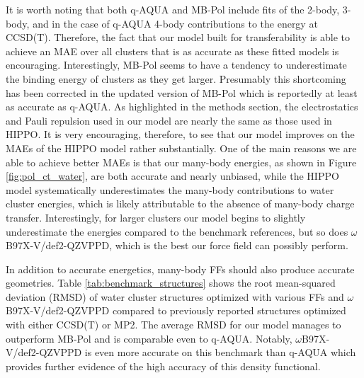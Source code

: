 \documentclass[journal=jctcce,manuscript=article]{achemso}
\begin{document}
It is worth noting that both q-AQUA and MB-Pol include fits of the 2-body, 3-body, and in the case of q-AQUA 4-body contributions to the energy at CCSD(T). Therefore, the fact that our model built for transferability is able to achieve an MAE over all clusters that is as accurate as these fitted models is encouraging. Interestingly, MB-Pol seems to have a tendency to underestimate the binding energy of clusters as they get larger. Presumably this shortcoming has been corrected in the updated version of MB-Pol\cite{zhu2023mb} which is reportedly at least as accurate as q-AQUA. As highlighted in the methods section, the electrostatics and Pauli repulsion used in our  model are nearly the same as those used in HIPPO.\cite{rackers2021polarizable} It is very encouraging, therefore, to see that our model improves on the MAEs of the HIPPO model rather substantially. One of the main reasons we are able to achieve better MAEs is that our many-body energies, as shown in Figure \ref{fig:pol_ct_water}, are both accurate and nearly unbiased, while the HIPPO model systematically underestimates the many-body contributions to water cluster energies\cite{rackers2021polarizable}, which is likely attributable to the absence of many-body charge transfer. Interestingly, for larger clusters our model begins to slightly underestimate the energies compared to the benchmark references, but so does $\omega$B97X-V/def2-QZVPPD, which is the best our force field can possibly perform. 

In addition to accurate energetics, many-body FFs should also produce accurate geometries. Table \ref{tab:benchmark_structures} shows the root mean-squared deviation (RMSD) of water cluster structures optimized with various FFs and $\omega$B97X-V/def2-QZVPPD compared to previously reported structures optimized with either CCSD(T) or MP2.\cite{herman2023extensive} The average RMSD for our model manages to outperform MB-Pol and is comparable even to q-AQUA. Notably, $\omega$B97X-V/def2-QZVPPD is even more accurate on this benchmark than q-AQUA which provides further evidence of the high accuracy of this density functional.
\end{document}
